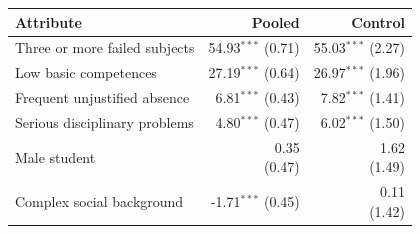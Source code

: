 \begin{tabular}{p{6.4cm}rr}
\toprule
Attribute & Pooled & Control \\
\midrule
Three or more failed subjects & \shortstack{54.93$^{***}$\\{\scriptsize (0.71)}} & \shortstack{55.03$^{***}$\\{\scriptsize (2.27)}} \\
Low basic competences & \shortstack{27.19$^{***}$\\{\scriptsize (0.64)}} & \shortstack{26.97$^{***}$\\{\scriptsize (1.96)}} \\
Frequent unjustified absence & \shortstack{6.81$^{***}$\\{\scriptsize (0.43)}} & \shortstack{7.82$^{***}$\\{\scriptsize (1.41)}} \\
Serious disciplinary problems & \shortstack{4.80$^{***}$\\{\scriptsize (0.47)}} & \shortstack{6.02$^{***}$\\{\scriptsize (1.50)}} \\
Male student & \shortstack{0.35\\{\scriptsize (0.47)}} & \shortstack{1.62\\{\scriptsize (1.49)}} \\
Complex social background & \shortstack{-1.71$^{***}$\\{\scriptsize (0.45)}} & \shortstack{0.11\\{\scriptsize (1.42)}} \\
\bottomrule
\end{tabular}
